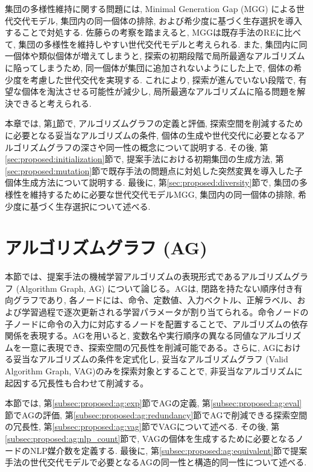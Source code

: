 \documentclass[11pt,oneside,openany,report]{jsbook}
\begin{document}
集団の多様性維持に関する問題には, Minimal Generation Gap (MGG) \cite{mgg}による世代交代モデル, 集団内の同一個体の排除, および希少度に基づく生存選択を導入することで対処する. 佐藤らの考察を踏まえると, MGGは既存手法のREに比べて, 集団の多様性を維持しやすい世代交代モデルと考えられる\cite{mgg}. また, 集団内に同一個体や類似個体が増えてしまうと, 探索の初期段階で局所最適なアルゴリズムに陥ってしまうため, 同一個体が集団に追加されないようにした上で, 個体の希少度を考慮した世代交代を実現する. これにより, 探索が進んでいない段階で, 有望な個体を淘汰させる可能性が減少し, 局所最適なアルゴリズムに陥る問題を解決できると考えられる.

本章では, 第\ref{sec:proposed:ag}節で, アルゴリズムグラフの定義と評価, 探索空間を削減するために必要となる妥当なアルゴリズムの条件, 個体の生成や世代交代に必要となるアルゴリズムグラフの深さや同一性の概念について説明する. その後, 第\ref{sec:proposed:initialization}節で, 提案手法における初期集団の生成方法, 第\ref{sec:proposed:mutation}節で既存手法の問題点に対処した突然変異を導入した子個体生成方法について説明する. 最後に, 第\ref{sec:proposed:diversity}節で, 集団の多様性を維持するために必要な世代交代モデルMGG, 集団内の同一個体の排除, 希少度に基づく生存選択について述べる.

\section{アルゴリズムグラフ (AG)}\label{sec:proposed:ag}

本節では、提案手法の機械学習アルゴリズムの表現形式であるアルゴリズムグラフ (Algorithm Graph, AG) について論じる。AGは, 閉路を持たない順序付き有向グラフであり, 各ノードには、命令、定数値、入力ベクトル、正解ラベル、および学習過程で逐次更新される学習パラメータが割り当てられる。命令ノードの子ノードに命令の入力に対応するノードを配置することで、アルゴリズムの依存関係を表現する。AGを用いると, 変数名や実行順序の異なる同値なアルゴリズムを一意に表現でき、探索空間の冗長性を削減可能である。さらに, AGにおける妥当なアルゴリズムの条件を定式化し, 妥当なアルゴリズムグラフ (Valid Algorithm Graph, VAG)のみを探索対象とすることで, 非妥当なアルゴリズムに起因する冗長性も合わせて削減する。

本節では, 第\ref{subsec:proposed:ag:exp}節でAGの定義, 第\ref{subsec:proposed:ag:eval}節でAGの評価, 第\ref{subsec:proposed:ag:redundancy}節でAGで削減できる探索空間の冗長性, 第\ref{subsec:proposed:ag:vag}節でVAGについて述べる. その後, 第\ref{subsec:proposed:ag:nlp_count}節で, VAGの個体を生成するために必要となるノードのNLP媒介数を定義する. 最後に, 第\ref{subsec:proposed:ag:equivalent}節で提案手法の世代交代モデルで必要となるAGの同一性と構造的同一性について述べる.
\end{document}
